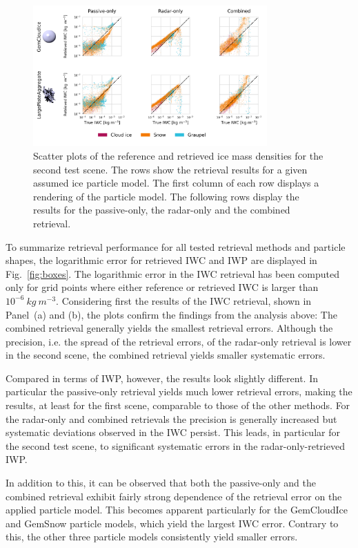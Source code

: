 \documentclass[journal abbreviation, manuscript]{copernicus}
\begin{document}
\begin{figure}
\centering
\includegraphics[width = 0.8\textwidth]{../plots/results_scatter_b_1}
\caption{Scatter plots of the reference and retrieved ice mass densities for
  the second test scene. The rows show the retrieval results for a given
  assumed ice particle model. The first column of each row displays a rendering
  of the particle model. The following rows display the results for the
  passive-only, the radar-only and the combined retrieval.}
\label{fig:results_scatter_b_1}
\end{figure}

To summarize retrieval performance for all tested retrieval methods and particle
shapes, the logarithmic error for retrieved IWC and IWP are displayed in
Fig.~\ref{fig:boxes}. The logarithmic error in the IWC retrieval has been
computed only for grid points where either reference or retrieved IWC is larger
than $10^{-6}\ \unit{kg\ m^{-3}}$. Considering first the results of the IWC
retrieval, shown in Panel~(a) and (b), the plots confirm the findings from the
analysis above: The combined retrieval generally yields the smallest retrieval
errors. Although the precision, i.e. the spread of the retrieval errors, of the
radar-only retrieval is lower in the second scene, the combined retrieval yields
smaller systematic errors.

Compared in terms of IWP, however, the results look slightly different. In
particular the passive-only retrieval yields much lower retrieval errors, making
the results, at least for the first scene, comparable to those of the other
methods. For the radar-only and combined retrievals the precision is generally
increased but systematic deviations observed in the IWC persist. This leads, in
particular for the second test scene, to significant systematic errors in the
radar-only-retrieved IWP.

In addition to this, it can be observed that both the passive-only and the
combined retrieval exhibit fairly strong dependence of the retrieval error on
the applied particle model. This becomes apparent particularly for the
GemCloudIce and GemSnow particle models, which yield the largest IWC error.
Contrary to this, the other three particle models consistently yield smaller
errors.
\end{document}
